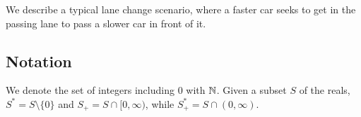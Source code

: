 \begin{exmp}
	We describe a typical lane change scenario, where a faster car seeks to get in the passing lane to pass a slower car in front of it. 
	
\end{exmp}


%
%
%
%

\subsection{Notation}
We denote the set of integers including 0 with $\mathbb{N}$. 
Given a subset $S$ of the reals, $S^* = S \setminus \{0\}$ and $S_+ = S \cap [0,\infty)$,
while $S_+^* = S \cap (0,\infty)$.